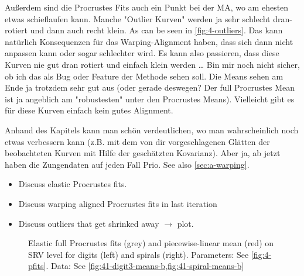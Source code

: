 Außerdem sind die Procrustes Fits auch ein Punkt bei der MA, wo am ehesten etwas schieflaufen kann.
Manche "Outlier Kurven" werden ja sehr schlecht dran-rotiert und dann auch recht klein. 
As can be seen in \cref{fig:4-outliers}.
Das kann natürlich Konsequenzen für das Warping-Alignment haben, dass sich dann nicht anpassen kann oder sogar schlechter wird.
Es kann also passieren, dass diese Kurven nie gut dran rotiert und einfach klein werden \dots
Bin mir noch nicht sicher, ob ich das als Bug oder Feature der Methode sehen soll.
Die Means sehen am Ende ja trotzdem sehr gut aus (oder gerade deswegen? 
Der full Procrustes Mean ist ja angeblich am "robustesten" unter den Procrustes Means). 
Vielleicht gibt es für diese Kurven einfach kein gutes Alignment.

Anhand des Kapitels kann man schön verdeutlichen, wo man wahrscheinlich noch etwas verbessern kann (z.B. mit dem von dir vorgeschlagenen Glätten der beobachteten Kurven mit Hilfe der geschätzten Kovarianz). 
Aber ja, ab jetzt haben die Zungendaten auf jeden Fall Prio.
See also \cref{sec:a-warping}.


\begin{itemize}
  \item Discuss elastic Procrustes fits.
  \item Discuss warping aligned Procrustes fits in last iteration
  \item Discuss outliers that get shrinked away $\rightarrow$ plot.
\end{itemize}

\begin{figure}
  \centering
  \begin{subfigure}{0.48\textwidth}
  \end{subfigure}
  \begin{subfigure}{0.48\textwidth}
  \end{subfigure}
  \caption{Elastic full Procrustes fits (grey) and piecewise-linear mean (red) on SRV level for digits (left) and spirals (right).
  Parameters: See \cref{fig:4-pfits}.
  Data: See \cref{fig:41-digit3-means-b,fig:41-spiral-means-b}}
  \label{fig:4-pfits-srv}
\end{figure}

